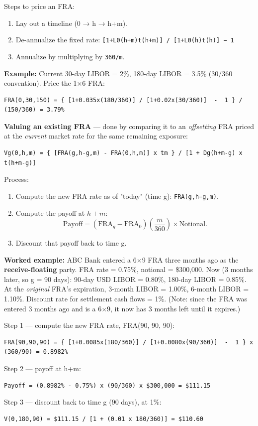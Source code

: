\documentclass[12pt,openany]{book}
\theoremstyle{definition}
\theoremstyle{remark}
\begin{document}
Steps to price an FRA:
\begin{enumerate}
\item Lay out a timeline (0 → h → h+m).
\item De-annualize the fixed rate: \texttt{[1+L0(h+m)t(h+m)] / [1+L0(h)t(h)] − 1}
\item Annualize by multiplying by \texttt{360/m}.
\end{enumerate}
\textbf{Example:} Current 30-day LIBOR = 2\%, 180-day LIBOR = 3.5\% (30/360 convention). Price the 1×6 FRA:
\begin{lstlisting}[style=notesCode]
FRA(0,30,150) = { [1+0.035x(180/360)] / [1+0.02x(30/360)]  -  1 } / (150/360) = 3.79%
\end{lstlisting}

\textbf{Valuing an existing FRA} — done by comparing it to an \emph{offsetting} FRA priced at the \emph{current} market rate for the same remaining exposure:
\begin{lstlisting}[style=notesCode]
Vg(0,h,m) = { [FRA(g,h-g,m) - FRA(0,h,m)] x tm } / [1 + Dg(h+m-g) x t(h+m-g)]
\end{lstlisting}
Process:
\begin{enumerate}
\item Compute the new FRA rate as of "today" (time g): \texttt{FRA(g,h−g,m)}.
\item Compute the payoff at \(h+m\):
\[
\text{Payoff}=(\mathrm{FRA}_g-\mathrm{FRA}_0)\left(\frac{m}{360}\right)\times\text{Notional}.
\]
\item Discount that payoff back to time g.
\end{enumerate}
\textbf{Worked example:} ABC Bank entered a 6×9 FRA three months ago as the \textbf{receive-floating} party. FRA rate = 0.75\%, notional = \$300,000. Now (3 months later, so g = 90 days): 90-day USD LIBOR = 0.80\%, 180-day LIBOR = 0.85\%. At the \emph{original} FRA's expiration, 3-month LIBOR = 1.00\%, 6-month LIBOR = 1.10\%. Discount rate for settlement cash flows = 1\%. (Note: since the FRA was entered 3 months ago and is a 6×9, it now has 3 months left until it expires.)

Step 1 — compute the new FRA rate, FRA(90, 90, 90):
\begin{lstlisting}[style=notesCode]
FRA(90,90,90) = { [1+0.0085x(180/360)] / [1+0.0080x(90/360)]  -  1 } x (360/90) = 0.8982%
\end{lstlisting}
Step 2 — payoff at h+m:
\begin{lstlisting}[style=notesCode]
Payoff = (0.8982% - 0.75%) x (90/360) x $300,000 = $111.15
\end{lstlisting}
Step 3 — discount back to time g (90 days), at 1\%:
\begin{lstlisting}[style=notesCode]
V(0,180,90) = $111.15 / [1 + (0.01 x 180/360)] = $110.60
\end{lstlisting}
\end{document}
